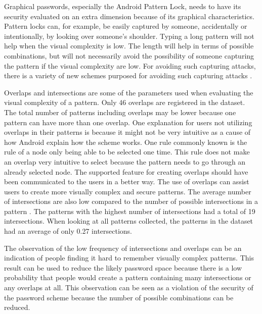       Graphical passwords, especially the Android Pattern Lock, needs to have its security evaluated on an extra dimension because of its graphical characteristics. Pattern locks can, for example, be easily captured by someone, accidentally or intentionally, by looking over someone's shoulder. Typing a long pattern will not help when the visual complexity is low. The length will help in terms of possible combinations, but will not necessarily avoid the possibility of someone capturing the pattern if the visual complexity are low.  For avoiding such capturing attacks, there is a variety of new schemes purposed for avoiding such capturing attacks \cite{Wiedenbeck, IPAS}. 

      Overlaps and intersections are some of the parameters used when evaluating the visual complexity of a pattern. Only 46 overlaps are registered in the dataset. The total number of patterns including overlaps may be lower because one pattern can have more than one overlap. One explanation for users not utilizing overlaps in their patterns is because it might not be very intuitive as a cause of how Android explain how the scheme works. One rule commonly known is the rule of a node only being able to be selected one time. This rule does not make an overlap very intuitive to select because the pattern needs to go through an already selected node. The supported feature for creating overlaps should have been communicated to the users in a better way. The use of overlaps can assist users to create more visually complex and secure patterns. The average number of intersections are also low compared to the number of possible intersections in a pattern \cite{Sun}. The patterns with the highest number of intersections had a total of 19 intersections. When looking at all patterns collected, the patterns in the dataset had an average of only 0.27 intersections. 

      The observation of the low frequency of intersections and overlaps can be an indication of people finding it hard to remember visually complex patterns. This result can be used to reduce the likely password space because there is a low probability that people would create a pattern containing many intersections or any overlaps at all. This observation can be seen as a violation of the security of the password scheme because the number of possible combinations can be reduced. 
    
    \clearpage
